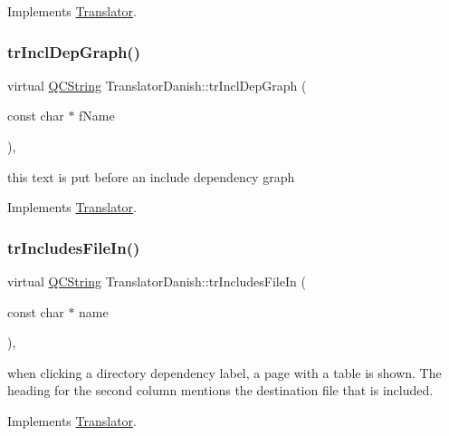 Implements \mbox{\hyperlink{class_translator}{Translator}}.

\mbox{\label{class_translator_danish_ab930cb3d885793f2bde9aab91ee450a0}} 
\subsubsection{\texorpdfstring{trInclDepGraph()}{trInclDepGraph()}}
{\footnotesize\ttfamily virtual \mbox{\hyperlink{class_q_c_string}{Q\+C\+String}} Translator\+Danish\+::tr\+Incl\+Dep\+Graph (\begin{DoxyParamCaption}\item[{const char $\ast$}]{f\+Name }\end{DoxyParamCaption})\hspace{0.3cm}{\ttfamily [inline]}, {\ttfamily [virtual]}}

this text is put before an include dependency graph 

Implements \mbox{\hyperlink{class_translator}{Translator}}.

\mbox{\label{class_translator_danish_a3d0c89fe22355600358dc15fec3bbf9a}} 
\subsubsection{\texorpdfstring{trIncludesFileIn()}{trIncludesFileIn()}}
{\footnotesize\ttfamily virtual \mbox{\hyperlink{class_q_c_string}{Q\+C\+String}} Translator\+Danish\+::tr\+Includes\+File\+In (\begin{DoxyParamCaption}\item[{const char $\ast$}]{name }\end{DoxyParamCaption})\hspace{0.3cm}{\ttfamily [inline]}, {\ttfamily [virtual]}}

when clicking a directory dependency label, a page with a table is shown. The heading for the second column mentions the destination file that is included. 

Implements \mbox{\hyperlink{class_translator}{Translator}}.

\mbox{\label{class_translator_danish_a6418fe1f9a358c61cbe7dc6333d81823}} 
